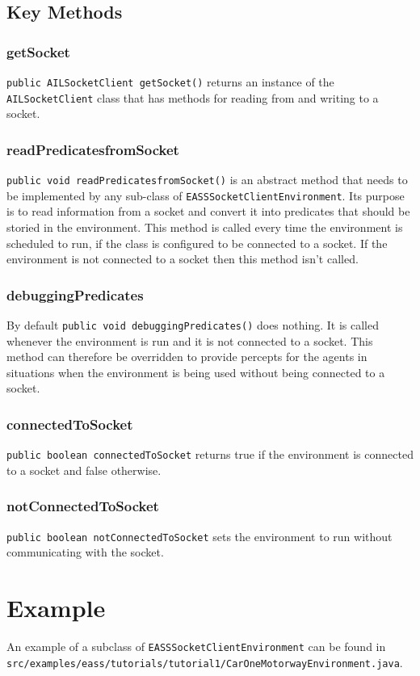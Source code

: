 \documentclass[a4]{article}
\begin{document}
\subsection{Key Methods}

\subsubsection{getSocket}
\texttt{public AILSocketClient getSocket()} returns an instance of the \texttt{AILSocketClient} class that has methods for reading from and writing to a socket.

\subsubsection{readPredicatesfromSocket}
\texttt{public void readPredicatesfromSocket()} is an abstract method that needs to be implemented by any sub-class of \texttt{EASSSocketClientEnvironment}.  Its purpose is to read information from a socket and convert it into predicates that should be storied in the environment.  This method is called every time the environment is scheduled to run, if the class is configured to be connected to a socket.  If the environment is not connected to a socket then this method isn't called.

\subsubsection{debuggingPredicates}
By default \texttt{public void debuggingPredicates()} does nothing.  It is called whenever the environment is run and it is not connected to a socket.  This method can therefore be overridden to provide percepts for the agents in situations when the environment is being used without being connected to a socket.

\subsubsection{connectedToSocket}
\texttt{public boolean connectedToSocket} returns true if the environment is connected to a socket and false otherwise.

\subsubsection{notConnectedToSocket}
\texttt{public boolean notConnectedToSocket} sets the environment to run without communicating with the socket.

\section{Example}
An example of a subclass of \texttt{EASSSocketClientEnvironment} can be found in \texttt{src/examples/eass/tutorials/tutorial1/CarOneMotorwayEnvironment.java}.
\end{document}
